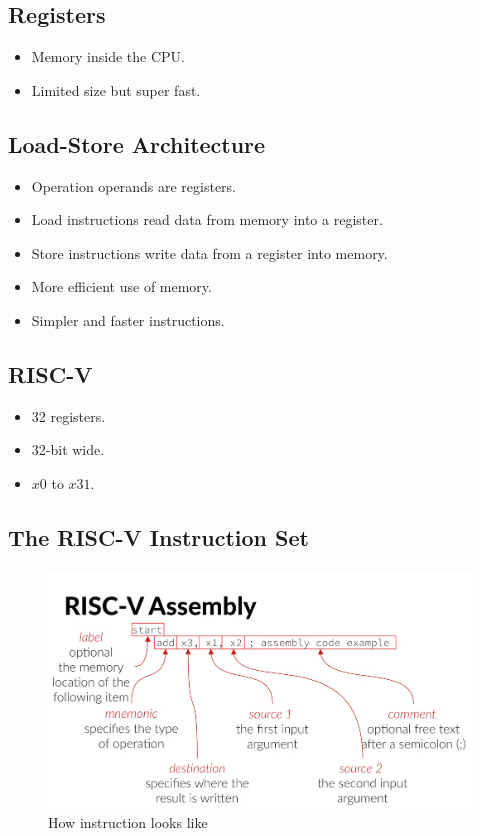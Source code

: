 \documentclass{article}
\begin{document}
\subsection*{Registers}
\begin{itemize}
    \item Memory inside the CPU.
    \item Limited size but super fast.
\end{itemize}

\subsection*{Load-Store Architecture}
\begin{itemize}
    \item Operation operands are registers.
    \item Load instructions read data from memory into a register.
    \item Store instructions write data from a register into memory.
    \item More efficient use of memory.
    \item Simpler and faster instructions.
\end{itemize}

\subsection*{RISC-V}
\begin{itemize}
    \item 32 registers.
    \item 32-bit wide.
    \item \( x0 \) to \( x31 \).
\end{itemize}

\subsection*{The RISC-V Instruction Set}
\begin{figure}
    \includegraphics[width=15cm]{images/Instructionconstruction.png}
    \caption{How instruction looks like}
    \label{figure:instruction}
\end{figure}
    
\end{document}
